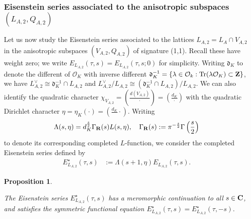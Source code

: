 \documentclass{amsart}
\newtheorem{proposition}[theorem]{Proposition}
\theoremstyle{definition}
\begin{document}
\subsubsection{Eisenstein series associated to the anisotropic subspaces $(L_{A,2}, Q_{A,2})$} 

Let us now study the Eisenstein series associated to the lattices $L_{A,2} = L_A \cap V_{A, 2}$ 
in the anisotropic subspaces $(V_{A, 2}, Q_{A, 2})$ of signature (1,1). 
Recall these have weight zero; we write $E_{L_{A,2}}(\tau, s) = E_{L_{A,2}}(\tau, s; 0)$ for simplicity.
Writing $\mathfrak{d}_{K}$ to denote the different of $\mathcal{O}_K$ with inverse different 
$\mathfrak{d}_{K}^{-1} = \left\lbrace \lambda \in \mathcal{O}_k: \operatorname{Tr}(\lambda \mathcal{O}_K) \subset {\bf{Z}} \right\rbrace$,
we have $L_{A,2}^{\vee} \cong \mathfrak{d}_{K}^{-1} \cap L_{A,2}$ and $L_{A,2}^{\vee}/L_{A,2} \cong (\mathfrak{d}_{K}^{-1} \cap L_{A,2} )/L_{A,2}$. 
We can also identify the quadratic character $\chi_{V_{A,2}}=\left( \frac{d(V_{A,2})}{\cdot} \right) = (\frac{d_K}{\cdot})$ with the quadratic 
Dirichlet character $\eta = \eta_K(\cdot) = (\frac{d_K}{}\cdot)$. Writing 
\begin{align*} \Lambda(s, \eta) =  d_K^{\frac{s}{2}} \Gamma_{\bf{R}}(s) L(s, \eta), 
\quad \Gamma_{\bf{R}}(s) := \pi^{-\frac{s}{2}} \Gamma \left( \frac{s}{2} \right) \end{align*} 
to denote its corresponding completed $L$-function, we consider the completed Eisenstein series defined by
\begin{align*} E^{\star}_{L_{A,2}}(\tau, s) &:= \Lambda(s+1, \eta) E_{L_{A,2}}(\tau, s). \end{align*}

\begin{proposition}\label{MSEis} 

The Eisenstein series $E_{L_{A,2}}^{\star}(\tau, s)$ has a meromorphic 
continuation to all $s \in {\bf{C}}$, and satisfies the symmetric functional equation 
$E^{\star}_{L_{A,2}}(\tau, s) = E_{L_{A,2}}^{\star}(\tau, -s).$ \end{proposition}
\end{document}
